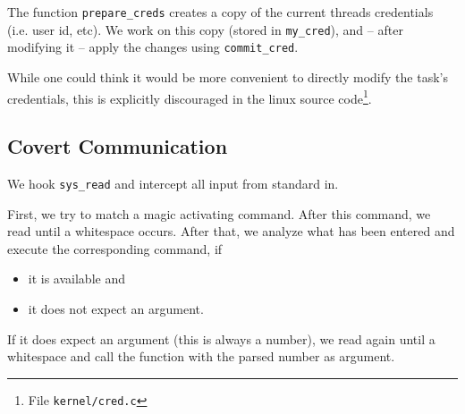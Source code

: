 \documentclass[10pt, letterpaper]{article}
\begin{document}
The function \texttt{prepare\_creds} creates a copy of the current threads credentials (i.e. user id, etc). We work on this copy (stored in \texttt{my\_cred}), and -- after modifying it -- apply the changes using \texttt{commit\_cred}.

While one could think it would be more convenient to directly modify the task's credentials, this is explicitly discouraged in the linux source code\footnote{File \texttt{kernel/cred.c}}.

\subsection{Covert Communication}
We hook \texttt{sys\_read} and intercept all input from standard in. 

First, we try to match a magic activating command. After this command, we read until a whitespace occurs. After that, we analyze what has been entered and execute the corresponding command, if 
\begin{itemize}
 \item it is available and
 \item it does not expect an argument.
\end{itemize}

If it does expect an argument (this is always a number), we read again until a whitespace and call the function with the parsed number as argument.
\end{document}
